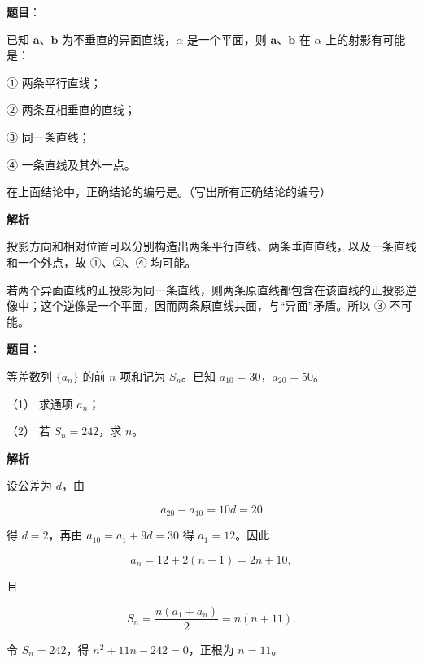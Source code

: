 \begin{answer}

\textbf{题目}：

已知 $\boldsymbol a\text{、}\boldsymbol b$ 为不垂直的异面直线，$\alpha$ 是一个平面，则 $\boldsymbol a\text{、}\boldsymbol b$ 在 $\alpha$ 上的射影有可能是：

① 两条平行直线；

② 两条互相垂直的直线；

③ 同一条直线；

④ 一条直线及其外一点。

在上面结论中，正确结论的编号是\gkblank{}。（写出所有正确结论的编号）

\textbf{解析}

投影方向和相对位置可以分别构造出两条平行直线、两条垂直直线，以及一条直线和一个外点，故 ①、②、④ 均可能。

若两个异面直线的正投影为同一条直线，则两条原直线都包含在该直线的正投影逆像中；这个逆像是一个平面，因而两条原直线共面，与“异面”矛盾。所以 ③ 不可能。


\end{answer}
\begin{answer}

\textbf{题目}：

等差数列 $\{a_n\}$ 的前 $n$ 项和记为 $S_n$。已知 $a_{10}=30$，$a_{20}=50$。

（1） 求通项 $a_n$；

（2） 若 $S_n=242$，求 $n$。

\textbf{解析}


设公差为 $d$，由

\nopagebreak[4]
\[
a_{20}-a_{10}=10d=20
\]

得 $d=2$，再由 $a_{10}=a_1+9d=30$ 得 $a_1=12$。因此

\nopagebreak[4]
\[
a_n=12+2(n-1)=2n+10,
\]


且

\nopagebreak[4]
\[
S_n=\frac{n(a_1+a_n)}2=n(n+11).
\]

令 $S_n=242$，得 $n^2+11n-242=0$，正根为 $n=11$。



\end{answer}
